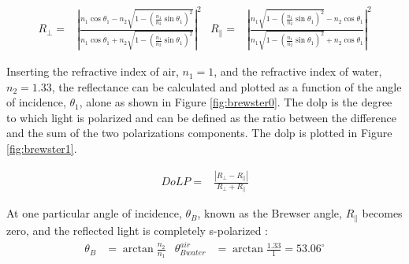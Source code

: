 \begin{align}
    R_\perp =         & \left|{\frac {n_{1}\cos \theta _1-n_{2}{\sqrt {1-\left({\frac {n_{1}}{n_{2}}}\sin \theta _1\right)^{2}}}}{n_{1}\cos \theta _1+n_{2}{\sqrt {1-\left({\frac {n_{1}}{n_{2}}}\sin \theta _1\right)^{2}}}}}\right|^{2}
                      &
    R_\parallel     = & \left|{\frac {n_{1}{\sqrt {1-\left({\frac {n_{1}}{n_{2}}}\sin \theta _1\right)^{2}}}-n_{2}\cos \theta _1}{n_{1}{\sqrt {1-\left({\frac {n_{1}}{n_{2}}}\sin \theta _1\right)^{2}}}+n_{2}\cos \theta _1}}\right|^{2}
\end{align}


Inserting the refractive index of air, $n_1 = 1$, and the refractive index of water, $n_2 = 1.33$, the reflectance can be calculated and plotted as a function of the angle of incidence, $\theta_1$, alone as shown in Figure \ref{fig:brewster0}.
The \gls{dolp} is the degree to which light is polarized and can be defined as the ratio between the difference and the sum of the two polarizations components. The \gls{dolp} is plotted in Figure \ref{fig:brewster1}.

\begin{align}
    DoLP= & \frac{\left | R_\perp - R_\parallel \right |}{R_\perp + R_\parallel}
\end{align}

At one particular angle of incidence, $\theta_B$, known as the Brewser angle, $R_\parallel$ becomes zero, and the reflected light is completely s-polarized \cite{BrewsterAngle2024}:
\begin{align}
    \theta_B & = \arctan{\frac{n_2}{n_1}} & \theta^{air}_{Bwater} & = \arctan{\frac{1.33}{1}} = 53.06^\circ
\end{align}

